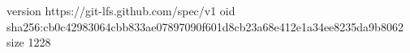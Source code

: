 version https://git-lfs.github.com/spec/v1
oid sha256:cb0c42983064cbb833ae07897090f601d8cb23a68e412e1a34ee8235da9b8062
size 1228
